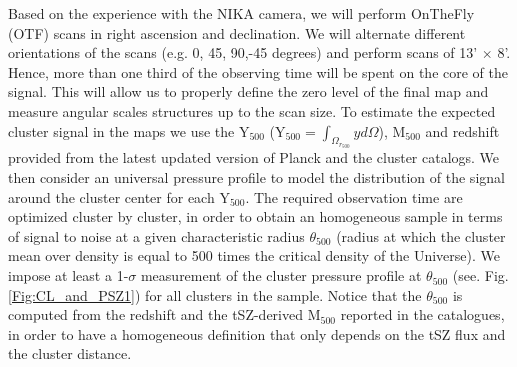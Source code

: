 \documentclass[11pt,a4paper,twoside,graphicx,color]{article}
\begin{document}
 Based on the experience with the NIKA camera, we will 
perform OnTheFly (OTF) scans in right ascension and declination. We will alternate different 
orientations of the scans (e.g. 0, 45, 90,-45 degrees) and perform scans of 13' $\times$ 8'. Hence, 
more than one third of the observing time will be spent on the core of the signal. This will allow us to properly define the zero level of the final map and measure angular scales structures up to the scan size. %
To estimate the expected cluster signal in the maps we use the Y$_{500}$ (Y$_{500} =  \int_{\Omega_{r_{500}}}y d\Omega$), M$_{500}$ and redshift provided from the latest updated version of Planck 
and the   cluster catalogs. We then consider an universal pressure profile \cite{Arnaud2010} to model the distribution of the signal around the cluster center for 
each   Y$_{500}$. The required observation time are optimized cluster by cluster, in order to obtain an homogeneous sample in terms of signal to noise at a given characteristic radius $\theta_{500}$ (radius at which the cluster mean over density is equal to 500 times the critical density of the Universe). 
We impose at least a 1-$\sigma$ measurement of the cluster pressure profile at $\theta_{500}$ (see. Fig. \ref{Fig:CL_and_PSZ1}) 
for all clusters in the sample. Notice that the $\theta_{500}$ is computed from the redshift and the tSZ-derived M$_{500}$ reported in the catalogues, in order to have a homogeneous definition that only depends on the tSZ flux and the cluster distance. 
\end{document}
